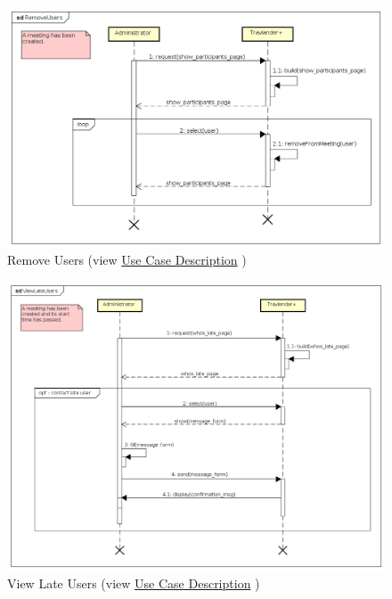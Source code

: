 \begin{figure}[h]
\centering\includegraphics[width=\textwidth]{Images/SequenceDiagrams/Admin/RemoveUsers.png}{}
\caption[Remove Users]{{Remove Users}\label{SeqDiagr:RemoveUsers} (view \hyperref[UseCaseDescr:RemoveUsers]{Use Case Description} )}
\end{figure}

\begin{figure}[h]
\centering\includegraphics[width=\textwidth]{Images/SequenceDiagrams/Admin/ViewLateUsers.png}{}
\caption[View Late Users]{{View Late Users}\label{SeqDiagr:LateUsers} (view \hyperref[UseCaseDescr:LateUsers]{Use Case Description} )}
\end{figure}

